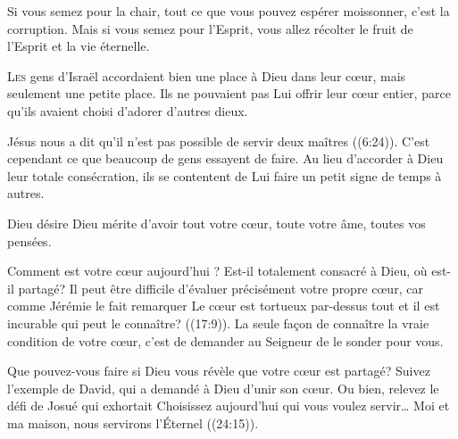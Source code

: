 Si vous semez pour la chair, tout ce que vous pouvez espérer moissonner,
 c'est la corruption. Mais si vous semez pour l'Esprit,
 vous allez récolter le fruit de l'Esprit et la vie éternelle. 

\dvrule







\lettrine{L}{es} gens d'Israël accordaient bien une place à Dieu
 dans leur c\oe{}ur, mais seulement une petite place.
 Ils ne pouvaient pas Lui offrir leur c\oe{}ur entier,
 parce qu'ils avaient choisi d'adorer d'autres dieux. 

Jésus nous a dit qu'il n'est pas possible de servir deux maîtres
 ((6:24)).
 C'est cependant ce que beaucoup de gens essayent de faire.
 Au lieu d'accorder à Dieu leur totale consécration,
 ils se contentent de Lui faire un petit signe de temps à autres. 


Dieu désire \ocadr Dieu mérite \fcadr{} d'avoir tout votre c\oe{}ur,
 toute votre âme, toutes vos pensées. 

Comment est votre c\oe{}ur aujourd'hui ? Est-il totalement consacré à Dieu,
 où est-il partagé? Il peut être difficile d'évaluer précisément
 votre propre c\oe{}ur, car comme Jérémie le fait remarquer\frcolon{}
 \Og Le c\oe{}ur est tortueux par-dessus tout et il est incurable\frcolon{}
 qui peut le connaître? \Fg{} ((17:9)).
 La seule fa\c{c}on de connaître la vraie condition de votre c\oe{}ur,
 c'est de demander au Seigneur de le sonder pour vous. 

Que pouvez-vous faire si Dieu vous révèle que votre c\oe{}ur est partagé?
 Suivez l'exemple de David, qui a demandé à Dieu d'unir son c\oe{}ur.
 Ou bien, relevez le défi de Josué qui exhortait\frcolon{} 
 \Og Choisissez aujourd'hui qui vous voulez servir\dots{}
 Moi et ma maison, nous servirons l'Éternel  \Fg{}
 ((24:15)). 

